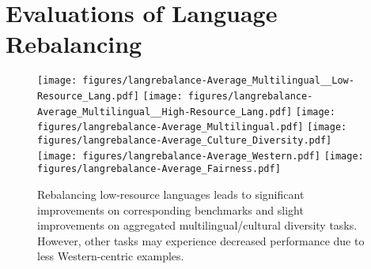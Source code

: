 \section{Evaluations of Language Rebalancing}
\label{appendix:lang_rebalance}

\begin{figure*}[h!]
    \texttt{[image: figures/langrebalance-Average\_Multilingual\_\_Low-Resource\_Lang.pdf]}
    \texttt{[image: figures/langrebalance-Average\_Multilingual\_\_High-Resource\_Lang.pdf]}
    \texttt{[image: figures/langrebalance-Average\_Multilingual.pdf]}
    \texttt{[image: figures/langrebalance-Average\_Culture\_Diversity.pdf]}
    \texttt{[image: figures/langrebalance-Average\_Western.pdf]}
    \texttt{[image: figures/langrebalance-Average\_Fairness.pdf]}
    \caption{Rebalancing low-resource languages leads to significant improvements on corresponding benchmarks and slight improvements on aggregated multilingual/cultural diversity tasks. However, other tasks may experience decreased performance due to less Western-centric examples.}
    \label{fig:lang_rebalance}
\end{figure*}

\FloatBarrier

